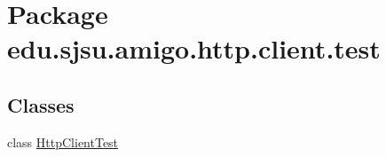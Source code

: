 \hypertarget{namespaceedu_1_1sjsu_1_1amigo_1_1http_1_1client_1_1test}{}\section{Package edu.\+sjsu.\+amigo.\+http.\+client.\+test}
\label{namespaceedu_1_1sjsu_1_1amigo_1_1http_1_1client_1_1test}
\subsection*{Classes}
\begin{DoxyCompactItemize}
\item 
class \hyperlink{classedu_1_1sjsu_1_1amigo_1_1http_1_1client_1_1test_1_1_http_client_test}{Http\+Client\+Test}
\end{DoxyCompactItemize}
